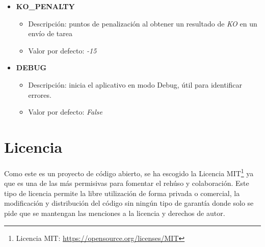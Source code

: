\documentclass[11pt,spanish,listoffigures,listoftables]{tfgetsinf}
\begin{document}
\begin{itemize}
	\item \textbf{KO\_PENALTY}
	\begin{itemize}
		\item Descripción: puntos de penalización al obtener un resultado de \textit{KO} en un envío de \Gls{tarea}
		\item Valor por defecto: \textit{-15}
	\end{itemize}
\end{itemize}

\begin{itemize}
	\item \textbf{DEBUG}
	\begin{itemize}
		\item Descripción: inicia el aplicativo en modo Debug, útil para identificar errores.
		\item Valor por defecto: \textit{False}
	\end{itemize}
\end{itemize}


\chapter{Licencia}

Como este es un proyecto de código abierto, se ha escogido la Licencia MIT\footnote{Licencia MIT: \url{https://opensource.org/licenses/MIT}} ya que es una de las más permisivas para fomentar el rehúso y colaboración. Este tipo de licencia permite la libre utilización de forma privada o comercial, la modificación y distribución del código sin ningún tipo de garantía donde solo se pide que se mantengan las menciones a la licencia y derechos de autor.


\glsaddall
\printglossary[title=Acrónimos,type=\acronymtype]

\glsaddall
\printglossary[title=Términos,toctitle=Terms and abbreviations]
\end{document}
